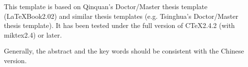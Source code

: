 
This template is based on Qinquan's Doctor/Master thesis template (LaTeXBook2.02)
and similar thesis templates (e.g. Tsinghua's Doctor/Master thesis template).
It has been tested under the full version of CTeX2.4.2 (with miktex2.4) or later.


Generally, the abstract and the key words should be consistent
with the Chinese version.

